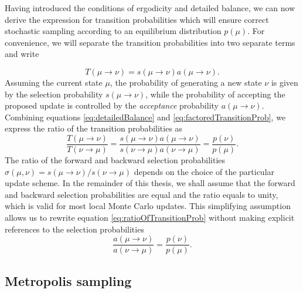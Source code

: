 \documentclass[12pt]{report}
\begin{document}
Having introduced the conditions of ergodicity and detailed balance, we can now derive the expression for transition probabilities which will ensure correct stochastic sampling according to an equilibrium distribution $p\left(\mu\right)$. 
For convenience, we will separate the transition probabilities into two separate terms and write


%
\begin{equation}
\label{eq:factoredTransitionProb}
T\left(\mu \rightarrow \nu\right) = s\left(\mu \rightarrow \nu\right)a\left(\mu \rightarrow \nu\right).
\end{equation}
Assuming the current state $\mu$, the probability of generating a new state $\nu$ is given by the selection probability $s\left(\mu \rightarrow \nu\right)$, while the probability of accepting the proposed update is controlled by the \textit{acceptance} probability $a\left(\mu \rightarrow \nu\right)$. Combining equations \ref{eq:detailedBalance} and \ref{eq:factoredTransitionProb}, we express the ratio of the transition probabilities as
%
\begin{equation}
\label{eq:ratioOfTransitionProb}
\frac{T\left(\mu \rightarrow \nu\right)}{T\left(\nu \rightarrow \mu\right)} = \frac{s\left(\mu \rightarrow \nu\right)a\left(\mu \rightarrow \nu\right)}{s\left(\nu \rightarrow \mu\right)a\left(\nu \rightarrow \mu\right)} = \frac{p\left(\nu\right)}{p\left(\mu\right)}.
\end{equation}
%
The ratio of the forward and backward selection probabilities
$\sigma(\mu,\nu) = s\left(\mu \rightarrow \nu\right)/s\left(\nu \rightarrow \mu\right)$
depends on the choice of the particular update scheme. In the remainder of this thesis, we shall assume that the forward and backward selection probabilities are equal and the ratio equals to unity, which is valid for most local Monte Carlo updates. This simplifying assumption allows us to rewrite equation \ref{eq:ratioOfTransitionProb} without making explicit references to the selection probabilities
%
\begin{equation}
\label{eq:acceptanceProbs}
\frac{a\left(\mu \rightarrow \nu\right)}{a\left(\nu \rightarrow \mu\right)} = \frac{p\left(\nu\right)}{p\left(\mu\right)}.
\end{equation}
%

\subsection{Metropolis sampling}
\end{document}
